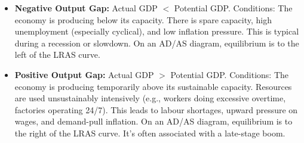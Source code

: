 \documentclass[11pt, a4paper, twoside]{book}
\begin{document}
\begin{itemize}
  \item \textbf{Negative Output Gap:} Actual GDP $<$ Potential GDP. Conditions: The economy is producing below its capacity. There is spare capacity, high unemployment (especially cyclical), and low inflation pressure. This is typical during a recession or slowdown. On an AD/AS diagram, equilibrium is to the left of the LRAS curve.
  \item \textbf{Positive Output Gap:} Actual GDP $>$ Potential GDP. Conditions: The economy is producing temporarily above its sustainable capacity. Resources are used unsustainably intensively (e.g., workers doing excessive overtime, factories operating 24/7). This leads to labour shortages, upward pressure on wages, and demand-pull inflation. On an AD/AS diagram, equilibrium is to the right of the LRAS curve. It's often associated with a late-stage boom.
\end{itemize}
\end{document}

